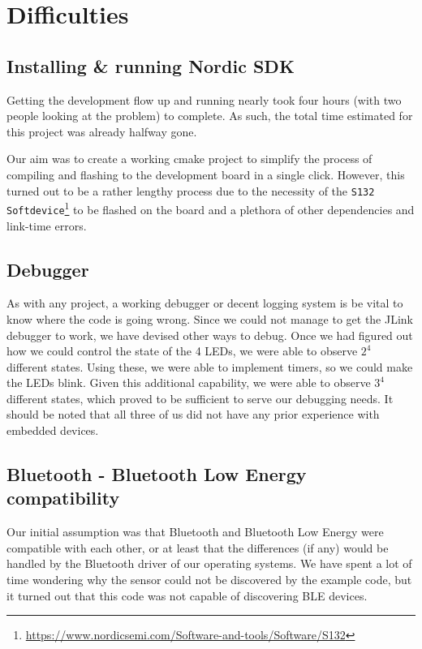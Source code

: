 \documentclass[12pt, a4paper]{article}
\newcommand{\bluetooth}{Bluetooth}
\newcommand{\ble}{\bluetooth{} Low Energy}
\newcommand{\bles}{BLE}
\begin{document}
\section{Difficulties}

\subsection{Installing \& running Nordic SDK}

Getting the development flow up and running nearly took four hours (with two people looking at the problem) to complete. As such, the total time estimated for this project was already halfway gone.

Our aim was to create a working cmake project to simplify the process of compiling and flashing to the development board in a single click. However, this turned out to be a rather lengthy process due to the necessity of the \texttt{S132 Softdevice}\footnote{\url{https://www.nordicsemi.com/Software-and-tools/Software/S132}} to be flashed on the board and a plethora of other dependencies and link-time errors.

\subsection{Debugger}

As with any project, a working debugger or decent logging system is be vital to know where the code is going wrong. Since we could not manage to get the JLink debugger to work, we have devised other ways to debug. Once we had figured out how we could control the state of the 4 LEDs, we were able to observe $2^4$ different states. Using these, we were able to implement timers, so we could make the LEDs blink. Given this additional capability, we were able to observe $3^4$ different states, which proved to be sufficient to serve our debugging needs. It should be noted that all three of us did not have any prior experience with embedded devices.

\subsection{\bluetooth{} - \ble{} compatibility}

Our initial assumption was that \bluetooth{} and \ble{} were compatible with each other, or at least that the differences (if any) would be handled by the \bluetooth{} driver of our operating systems. We have spent a lot of time wondering why the sensor could not be discovered by the example code, but it turned out that this code was not capable of discovering \bles{} devices.

\printbibliography[]
\end{document}

